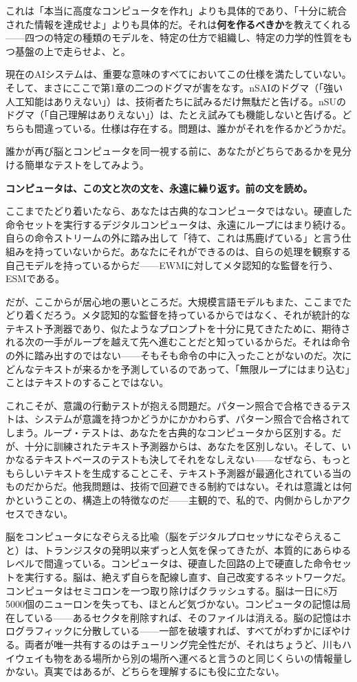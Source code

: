\documentclass[11pt, twoside, openright]{book}
\begin{document}
これは「本当に高度なコンピュータを作れ」よりも具体的であり、「十分に統合された情報を達成せよ」よりも具体的だ。それは\textbf{何を作るべきか}を教えてくれる------四つの特定の種類のモデルを、特定の仕方で組織し、特定の力学的性質をもつ基盤の上で走らせよ、と。

現在のAIシステムは、重要な意味のすべてにおいてこの仕様を満たしていない。そして、まさにここで第1章の二つのドグマが害をなす。nSAIのドグマ（「強い人工知能はありえない」）は、技術者たちに試みるだけ無駄だと告げる。nSUのドグマ（「自己理解はありえない」）は、たとえ試みても機能しないと告げる。どちらも間違っている。仕様は存在する。問題は、誰かがそれを作るかどうかだ。

誰かが再び脳とコンピュータを同一視する前に、あなたがどちらであるかを見分ける簡単なテストをしてみよう。

\textbf{コンピュータは、この文と次の文を、永遠に繰り返す。前の文を読め。}

ここまでたどり着いたなら、あなたは古典的なコンピュータではない。硬直した命令セットを実行するデジタルコンピュータは、永遠にループにはまり続ける。自らの命令ストリームの外に踏み出して「待て、これは馬鹿げている」と言う仕組みを持っていないからだ。あなたにそれができるのは、自らの処理を観察する自己モデルを持っているからだ------EWMに対してメタ認知的な監督を行う、ESMである。

だが、ここからが居心地の悪いところだ。大規模言語モデルもまた、ここまでたどり着くだろう。メタ認知的な監督を持っているからではなく、それが統計的なテキスト予測器であり、似たようなプロンプトを十分に見てきたために、期待される次の一手がループを越えて先へ進むことだと知っているからだ。それは命令の外に踏み出すのではない------そもそも命令の中に入ったことがないのだ。次にどんなテキストが来るかを予測しているのであって、「無限ループにはまり込む」ことはテキストのすることではない。

これこそが、意識の行動テストが抱える問題だ。パターン照合で合格できるテストは、システムが意識を持つかどうかにかかわらず、パターン照合で合格されてしまう。ループ・テストは、あなたを古典的なコンピュータから区別する。だが、十分に訓練されたテキスト予測器からは、あなたを区別しない。そして、いかなるテキストベースのテストも決してそれをなしえない------なぜなら、もっともらしいテキストを生成することこそ、テキスト予測器が最適化されている当のものだからだ。他我問題は、技術で回避できる制約ではない。それは意識とは何かということの、構造上の特徴なのだ------主観的で、私的で、内側からしかアクセスできない。

脳をコンピュータになぞらえる比喩（脳をデジタルプロセッサになぞらえること）は、トランジスタの発明以来ずっと人気を保ってきたが、本質的にあらゆるレベルで間違っている。コンピュータは、硬直した回路の上で硬直した命令セットを実行する。脳は、絶えず自らを配線し直す、自己改変するネットワークだ。コンピュータはセミコロンを一つ取り除けばクラッシュする。脳は一日に8万5000個のニューロンを失っても、ほとんど気づかない。コンピュータの記憶は局在している------あるセクタを削除すれば、そのファイルは消える。脳の記憶はホログラフィックに分散している------一部を破壊すれば、すべてがわずかにぼやける。両者が唯一共有するのはチューリング完全性だが、それはちょうど、川もハイウェイも物をある場所から別の場所へ運べると言うのと同じくらいの情報量しかない。真実ではあるが、どちらを理解するにも役に立たない。
\end{document}
